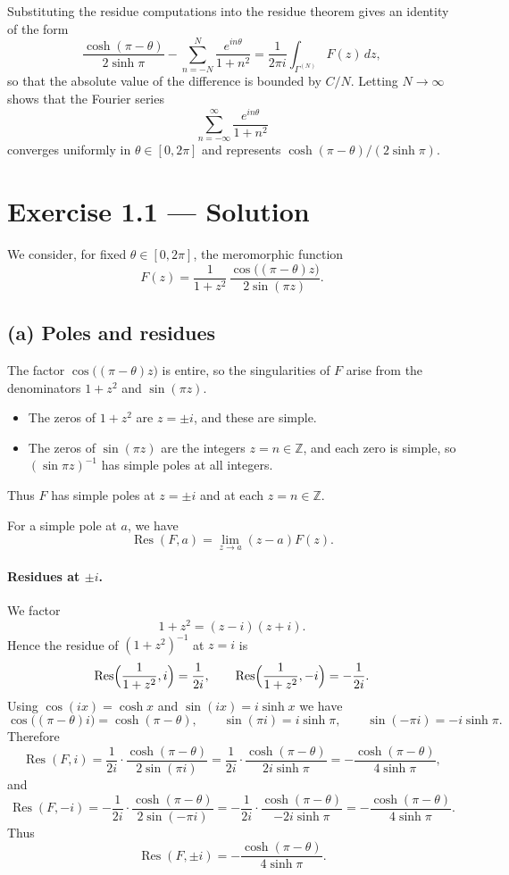 \documentclass[12pt,a4paper]{article}
\theoremstyle{plain}
\theoremstyle{definition}
\theoremstyle{remark}
\theoremstyle{remark}
\DeclareMathOperator{\Res}{Res}
\begin{document}
Substituting the residue computations into the residue theorem gives an identity of the form
\[
\frac{\cosh(\pi-\theta)}{2\sinh\pi}
- \sum_{n=-N}^N \frac{e^{in\theta}}{1+n^2}
= \frac{1}{2\pi i}\int_{\Gamma^{(N)}} F(z)\,dz,
\]
so that the absolute value of the difference is bounded by $C/N$.
Letting $N\to\infty$ shows that the Fourier series
\[
\sum_{n=-\infty}^{\infty} \frac{e^{in\theta}}{1+n^2}
\]
converges uniformly in $\theta\in[0,2\pi]$ and represents $\cosh(\pi-\theta)/(2\sinh\pi)$.

\section*{Exercise 1.1 — Solution}

We consider, for fixed $\theta\in[0,2\pi]$, the meromorphic function
\[
F(z) = \frac{1}{1+z^2}\,\frac{\cos\bigl((\pi-\theta)z\bigr)}{2\sin(\pi z)}.
\]

\subsection*{(a) Poles and residues}

The factor $\cos\bigl((\pi-\theta)z\bigr)$ is entire, so the singularities of $F$
arise from the denominators $1+z^2$ and $\sin(\pi z)$.

\begin{itemize}
	\item The zeros of $1+z^2$ are $z=\pm i$, and these are simple.
	\item The zeros of $\sin(\pi z)$ are the integers $z=n\in\mathbb{Z}$,
	and each zero is simple, so $(\sin\pi z)^{-1}$ has simple poles at all integers.
\end{itemize}
Thus $F$ has simple poles at $z=\pm i$ and at each $z=n\in\mathbb{Z}$.

For a simple pole at $a$, we have
\[
\Res(F,a) = \lim_{z\to a}(z-a)F(z).
\]

\paragraph{Residues at $\pm i$.}

We factor
\[
1+z^2=(z-i)(z+i).
\]
Hence the residue of $(1+z^2)^{-1}$ at $z=i$ is
\[
\Res\Bigl(\frac{1}{1+z^2},i\Bigr)
=\frac{1}{2i}, \qquad
\Res\Bigl(\frac{1}{1+z^2},-i\Bigr)
=-\frac{1}{2i}.
\]
Using $\cos(ix)=\cosh x$ and $\sin(ix)=i\sinh x$ we have
\[
\cos\bigl((\pi-\theta)i\bigr)=\cosh(\pi-\theta),
\qquad
\sin(\pi i)=i\sinh\pi,
\qquad
\sin(-\pi i)=-i\sinh\pi.
\]
Therefore
\[
\Res(F,i)
=\frac{1}{2i}\cdot\frac{\cosh(\pi-\theta)}{2\sin(\pi i)}
=\frac{1}{2i}\cdot\frac{\cosh(\pi-\theta)}{2i\sinh\pi}
=-\frac{\cosh(\pi-\theta)}{4\sinh\pi},
\]
and
\[
\Res(F,-i)
=-\frac{1}{2i}\cdot\frac{\cosh(\pi-\theta)}{2\sin(-\pi i)}
=-\frac{1}{2i}\cdot\frac{\cosh(\pi-\theta)}{-2i\sinh\pi}
=-\frac{\cosh(\pi-\theta)}{4\sinh\pi}.
\]
Thus
\[
\Res(F,\pm i)=-\frac{\cosh(\pi-\theta)}{4\sinh\pi}.
\]
\end{document}
